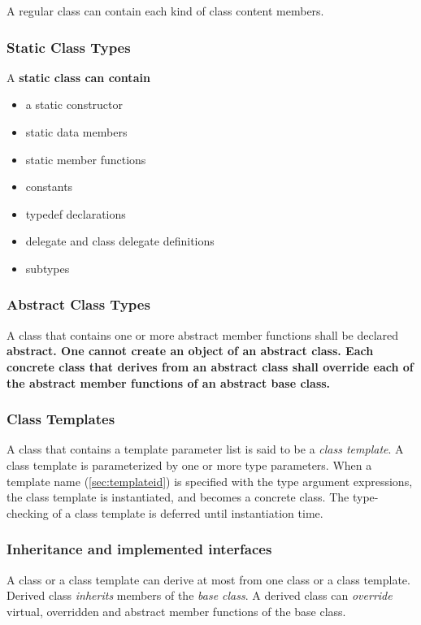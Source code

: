 \documentclass[a4paper,oneside,11pt]{article}
\begin{document}
A regular class can contain each kind of class content members.

\subsubsection{Static Class Types}

A \bf{static} class can contain
\begin{itemize}
\item a static constructor
\item static data members
\item static member functions
\item constants
\item typedef declarations
\item delegate and class delegate definitions
\item subtypes
\end{itemize}

\subsubsection{Abstract Class Types}

A class that contains one or more abstract member functions shall be declared \bf{abstract}.
One cannot create an object of an abstract class.
Each concrete class that derives from an abstract class shall override each of the
abstract member functions of an abstract base class.

\subsubsection{Class Templates}

A class that contains a template parameter list is said to be a \emph{class template}.
A class template is parameterized by one or more type parameters.
When a template name (\ref{sec:templateid}) is specified with the type argument expressions,
the class template is instantiated, and becomes a concrete class.
The type-checking of a class template is deferred until instantiation time.

\subsubsection{Inheritance and implemented interfaces}

A class or a class template can derive at most from one class or a class template.
Derived class \emph{inherits} members of the \emph{base class}.
A derived class can \emph{override} virtual, overridden and abstract member functions of the base class.
\end{document}
